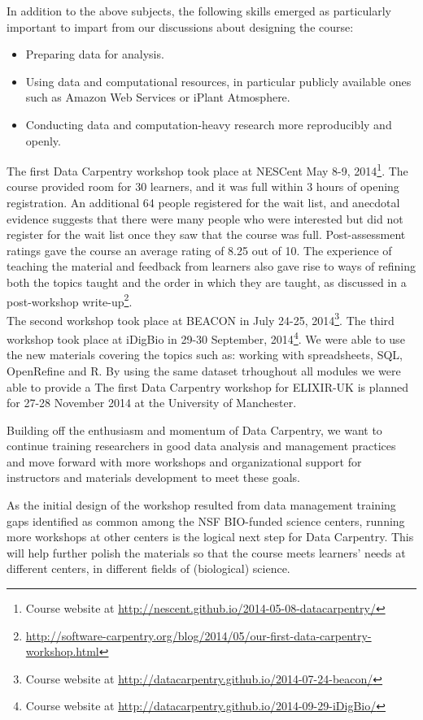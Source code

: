 \documentclass[15]{idcc}
\begin{document}
In addition to the above subjects, the following skills emerged as particularly important to impart from our discussions about designing the course:
\begin{itemize}
\item Preparing data for analysis.
\item Using data and computational resources, in particular publicly available ones such as Amazon Web Services or iPlant Atmosphere.
\item Conducting data and computation-heavy research more reproducibly and openly.
\end{itemize}

The first Data Carpentry workshop took place at NESCent May 8-9, 2014\footnote{Course website at \url{http://nescent.github.io/2014-05-08-datacarpentry/}}. The course provided room for 30 learners, and it was full within 3 hours of opening registration. An additional 64 people registered for the wait list, and anecdotal evidence suggests that there were many people who were interested but did not register for the wait list once they saw that the course was full. Post-assessment ratings gave the course an average rating of 8.25 out of 10. The experience of teaching the material and feedback from learners also gave rise to ways of refining both the topics taught and the order in which they are taught, as discussed in a post-workshop write-up\footnote{\url{http://software-carpentry.org/blog/2014/05/our-first-data-carpentry-workshop.html}}.\\

The second workshop took place at BEACON in July 24-25, 2014\footnote{Course website at \url{http://datacarpentry.github.io/2014-07-24-beacon/}}. The third workshop took place at iDigBio in 29-30 September, 2014\footnote{Course website at \url{http://datacarpentry.github.io/2014-09-29-iDigBio/}}. We were able to use the new materials covering the topics such as: working with spreadsheets, SQL, OpenRefine and R. By using the same dataset trhoughout all modules we were able to provide a 
The first Data Carpentry workshop for ELIXIR-UK is planned for 27-28 November 2014 at the University of Manchester. 

Building off the enthusiasm and momentum of Data Carpentry, we want to continue training researchers in good data analysis and management practices and move forward with more workshops and organizational support for instructors and materials development to meet these goals.

As the initial design of the workshop resulted from data management training gaps identified as common among the  NSF BIO-funded science centers, running more workshops at other centers is the logical next step for Data Carpentry. This will help further polish the materials so that the course meets learners' needs at different centers, in different fields of (biological) science. 
\end{document}

